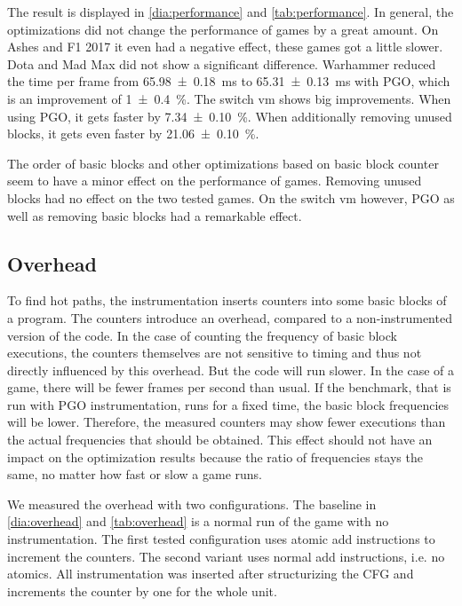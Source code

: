 \begin{table}
	\centering
	\label{tab:performance}
\end{table}

The result is displayed in \cref{dia:performance} and \cref{tab:performance}.
In general, the optimizations did not change the performance of games by a great amount.
On Ashes and F1 2017 it even had a negative effect, these games got a little slower.
Dota and Mad Max did not show a significant difference.
Warhammer reduced the time per frame from \SI{65.98 \pm 0.18}{\milli\second} to \SI{65.31 \pm 0.13}{\milli\second} with PGO, which is an improvement of \SI{1 \pm 0.4}{\percent}.
The switch vm shows big improvements. When using PGO, it gets faster by \SI{7.34 \pm 0.10}{\percent}.
When additionally removing unused blocks, it gets even faster by \SI{21.06 \pm 0.10}{\percent}.

The order of basic blocks and other optimizations based on basic block counter seem to have a minor effect on the performance of games.
Removing unused blocks had no effect on the two tested games.
On the switch vm however, PGO as well as removing basic blocks had a remarkable effect.

\subsection{Overhead}
\label{sub:overhead}
To find hot paths, the instrumentation inserts counters into some basic blocks of a program. The counters introduce an overhead, compared to a non-instrumented version of the code.
In the case of counting the frequency of basic block executions, the counters themselves are not sensitive to timing and thus not directly influenced by this overhead.
But the code will run slower. In the case of a game, there will be fewer frames per second than usual.
If the benchmark, that is run with PGO instrumentation, runs for a fixed time, the basic block frequencies will be lower.
Therefore, the measured counters may show fewer executions than the actual frequencies that should be obtained.
This effect should not have an impact on the optimization results because the ratio of frequencies stays the same, no matter how fast or slow a game runs.

We measured the overhead with two configurations.
The baseline in \cref{dia:overhead} and \cref{tab:overhead} is a normal run of the game with no instrumentation.
The first tested configuration uses atomic add instructions to increment the counters.
The second variant uses normal add instructions, i.e. no atomics.
All instrumentation was inserted after structurizing the CFG and increments the counter by one for the whole unit.


